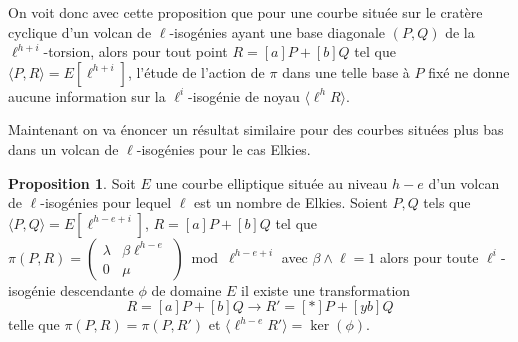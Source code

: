 \documentclass[10pt,a4paper]{book}
\theoremstyle{plain}
\theoremstyle{definition}
\theoremstyle{definition}
\theoremstyle{definition}
\newtheorem{prop}[thm]{Proposition}
\theoremstyle{definition}
\theoremstyle{remark}
\theoremstyle{remark}
\theoremstyle{definition}
\begin{document}
On voit donc avec cette proposition que pour une courbe située sur le cratère 
cyclique d'un volcan de $\ell$-isogénies ayant une base diagonale $(P,Q)$ de la
$\ell^{h+i}$-torsion, alors pour tout point $R=[a]P+[b]Q$ tel que $\langle P,R 
\rangle=E[\ell^{h+i}]$, l'étude de l'action de $\pi$ dans une telle base à $P$
fixé ne donne aucune information sur la $\ell^{i}$-isogénie de noyau $\langle 
\ell^{h}R \rangle$.

Maintenant on va énoncer un résultat similaire pour des courbes situées plus 
bas dans un volcan de $\ell$-isogénies pour le cas Elkies. 

\begin{prop}
Soit $E$ une courbe elliptique située au niveau $h-e$ d'un volcan de 
$\ell$-isogénies pour lequel $\ell$ est un nombre de Elkies. Soient $P,Q$ tels 
que $\langle P,Q \rangle=E[\ell^{h-e+i}]$, $R=[a]P+[b]Q$ tel que $\pi(P,R)
= \left( \begin{matrix}\lambda & \beta \ell^{h-e} \\0 & \mu \end{matrix}\right)
\bmod \ell^{h-e+i}$ avec $\beta \wedge \ell=1$ alors pour toute $\ell^i$-isogénie descendante $\phi$ de 
domaine $E$ il existe une transformation \begin{equation*}
R=[a]P+[b]Q \rightarrow R'=[*]P+[yb]Q
\end{equation*}
telle que $\pi(P,R)=\pi(P,R')$ et $\langle \ell^{h-e}R' \rangle = \ker(\phi)$.
\end{prop}
\end{document}
